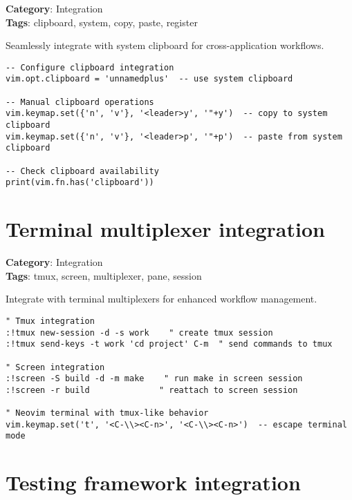 {{{{{{\textbf{Category}: Integration\\ \textbf{Tags}: clipboard, system, copy, paste, register
\vspace{0.5cm}

Seamlessly integrate with system clipboard for cross-application workflows.

\begin{Exa*}{}
\begin{Verbatim}[fontsize=\footnotesize, breaklines, breakanywhere]
-- Configure clipboard integration
vim.opt.clipboard = 'unnamedplus'  -- use system clipboard

-- Manual clipboard operations
vim.keymap.set({'n', 'v'}, '<leader>y', '"+y')  -- copy to system clipboard
vim.keymap.set({'n', 'v'}, '<leader>p', '"+p')  -- paste from system clipboard

-- Check clipboard availability
print(vim.fn.has('clipboard'))
\end{Verbatim}
\end{Exa*}

\section{Terminal multiplexer integration}

\textbf{Category}: Integration\\ \textbf{Tags}: tmux, screen, multiplexer, pane, session
\vspace{0.5cm}

Integrate with terminal multiplexers for enhanced workflow management.

\begin{Exa*}{}
\begin{Verbatim}[fontsize=\footnotesize, breaklines, breakanywhere]
" Tmux integration
:!tmux new-session -d -s work    " create tmux session
:!tmux send-keys -t work 'cd project' C-m  " send commands to tmux

" Screen integration  
:!screen -S build -d -m make    " run make in screen session
:!screen -r build              " reattach to screen session

" Neovim terminal with tmux-like behavior
vim.keymap.set('t', '<C-\\><C-n>', '<C-\\><C-n>')  -- escape terminal mode
\end{Verbatim}
\end{Exa*}

\section{Testing framework integration}

}}}}}}
